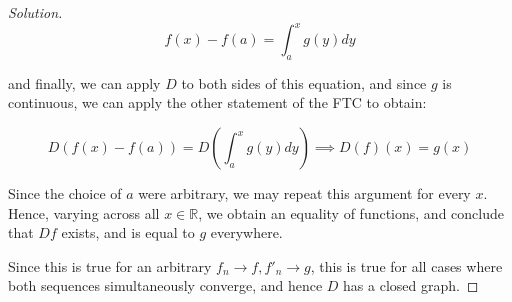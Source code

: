 \documentclass[10pt]{article}
\begin{document}
\begin{proof}[Solution]
$$ f(x)  - f(a) = \int_a^x g(y) dy$$

and finally, we can apply $D$ to both sides of this equation, and since $g$ is continuous, we can apply the other statement of the FTC to obtain:

$$ D(f(x) - f(a)) = D\left(\int_a^x g(y) dy \right) \implies D(f)(x) = g(x) $$

Since the choice of $a$ were arbitrary, we may repeat this argument for every $x$. Hence, varying across all $x \in \mathbb{R}$, we obtain an equality of functions, and conclude that $Df$ exists, and is equal to $g$ everywhere.

Since this is true for an arbitrary $f_n \to f, f'_n \to g$, this is true for all cases where both sequences simultaneously converge, and hence $D$ has a closed graph.

\end{proof}
\pagebreak
\end{document}
